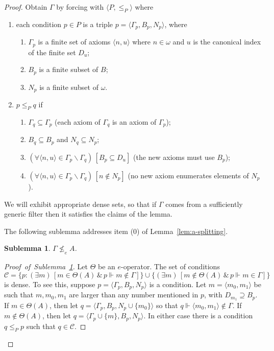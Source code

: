 \documentclass[10pt,a4paper]{amsart}
\newtheorem{sublemma}{Sublemma}
\newcommand{\QA}[1]{(\forall{#1})\,}
\newcommand{\QE}[1]{(\exists{#1})\,}
\begin{document}
\begin{proof}
Obtain $\Gamma$ by forcing with $\langle P, \leq_P \rangle$ where 
\begin{enumerate}
  \item[I.] each condition $p \in P$ is a triple $p=\langle \Gamma_p, B_p, 
      N_p\rangle$, where 
      
\begin{enumerate}
  \item[-] $\Gamma_p$ is a finite set of axioms $\langle n, u\rangle$ 
      where $n\in \omega$ and $u$ is the canonical index of the finite 
      set $D_u$; 
  \item[-] $B_p$ is a finite subset of $B$;
  \item[-] $N_p$ is a finite subset of $\omega$.
\end{enumerate}
  \item[II.] $p\leq_P q$ if
  \begin{enumerate}
    \item[-] $\Gamma_q \subseteq \Gamma_p$ (each axiom of $\Gamma_q$ is 
        an axiom of $\Gamma_p$);
    \item[-] $B_q \subseteq B_p$ and $N_q \subseteq N_p$;
    \item[-] $\QA{\langle n, u\rangle \in \Gamma_p \smallsetminus 
        \Gamma_q} \left[ B_p \subseteq D_u \right]$ (the new axioms must 
        use $B_p$); 
    \item[-] $\QA{\langle n, u\rangle \in \Gamma_p \smallsetminus 
        \Gamma_q} \left[ n \notin N_p \right]$ (no new axiom enumerates 
        elements of $N_p$). 
  \end{enumerate}
\end{enumerate} 

We will exhibit appropriate dense sets, so that if $\Gamma$ comes from a 
sufficiently generic filter then it satisfies the claims of the lemma.

The following sublemma addresses item (0) of Lemma~\ref{lem:a-splitting}. 

\begin{sublemma}\label{lem:0}
$\Gamma \nleq_e A$.
\end{sublemma}

\begin{proof}[Proof~of~Sublemma~\ref{lem:0}]
Let $\Theta$ be an $e$-operator. The set of conditions 
\[ 
\mathcal{C}=\{p: \QE{m}\left[m \in \Theta(A) \,\&\, p \Vdash m 
\notin \Gamma\right]\} \cup
\{\QE{m}\left[m \notin \Theta(A) \,\&\, p \Vdash m \in \Gamma\right]\}
\]
is dense. To see this, suppose $p=\langle \Gamma_p, B_p, N_p\rangle$ is a 
condition. Let $m=\langle m_0, m_1\rangle$ be such that $m, m_0, m_1$ are 
larger than any number mentioned in $p$, with $D_{m_1} \supseteq B_p$.
If $m \in \Theta(A)$, then let
$q=\langle \Gamma_p, B_p, N_p\cup \{m_0\}\rangle$
so that $q\Vdash \langle m_0, m_1\rangle \notin \Gamma$.
If $m \notin \Theta(A)$, then let $q=\langle \Gamma_p \cup \{m\}, B_p, N_p\rangle$.
In either case there is a condition $q \leq_P p$ such that $q \in \mathcal{C}$. 
\end{proof}


\end{proof}
\end{document}
